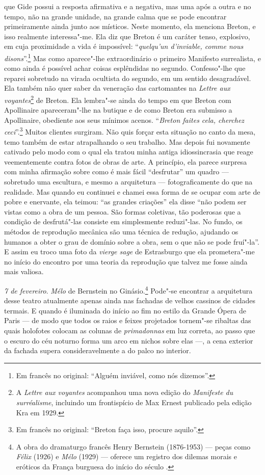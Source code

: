 que Gide possui a resposta afirmativa e a negativa, mas uma após a outra
e no tempo, não na grande unidade, na grande calma que se pode encontrar
primeiramente ainda junto aos místicos. Neste momento, ela menciona
Breton, e isso realmente interessa"-me. Ela diz que Breton é um caráter
tenso, explosivo, em cuja proximidade a vida é impossível:
``\emph{quelqu'un d'inviable, comme nous disons}''.\footnote{Em francês no original: ``Alguém inviável, como nós dizemos''. \versal{[N. T.]}} Mas como
aparece"-lhe extraordinário o primeiro Manifesto surrealista, e como
ainda é possível achar coisas esplêndidas no segundo. Confesso"-lhe que
reparei sobretudo na virada ocultista do segundo, em um sentido
desagradável. Ela também não quer saber da veneração das cartomantes na
\emph{Lettre aux voyantes}\footnote{A \emph{Lettre aux voyantes}
  acompanhou uma nova edição do \emph{Manifeste du surréalisme},
  incluindo um frontispício de Max Ernest publicado pela edição Kra em
  1929. \versal{[N. E.]}} de Breton. Ela lembra"-se ainda do tempo em que Breton com
Apollinaire apareceram"-lhe na butique e de como Breton era submisso a
Apollinaire, obediente aos seus mínimos acenos. ``\emph{Breton faites
cela, cherchez ceci}''.\footnote{Em francês no original: ``Breton faça isso, procure
  aquilo''. \versal{[N. T.]}} Muitos clientes surgiram. Não quis
forçar esta situação no canto da mesa, temo também de estar atrapalhando
o seu trabalho. Mas depois fui novamente cativado pelo modo com o qual
ela tratou minha antiga idiossincrasia que reage veementemente contra
fotos de obras de arte. A princípio, ela parece surpresa com minha
afirmação sobre como é mais fácil ``desfrutar'' um quadro --- sobretudo uma
escultura, e mesmo a arquitetura --- fotograficamente do que na
realidade. Mas quando eu continuei e chamei essa forma de se ocupar com
arte de pobre e enervante, ela teimou: ``as grandes criações'' ela disse
``não podem ser vistas como a obra de um pessoa. São formas coletivas,
tão poderosas que a condição de desfrutá"-las consiste em simplesmente
reduzi"-las. No fundo, os métodos de reprodução mecânica são uma técnica
de redução, ajudando os humanos a obter o grau de domínio sobre a obra,
sem o que não se pode fruí"-la''. E assim eu troco uma foto da
\emph{vierge sage} de Estrasburgo que ela prometera"-me no início do
encontro por uma teoria da reprodução que talvez me fosse ainda mais
valiosa.

\emph{7 de fevereiro}. \emph{Mélo} de Bernstein no Ginásio.\footnote{A obra do dramaturgo francês Henry Bernstein (1876-1953) --- peças como
  \emph{Félix} (1926) e \emph{Mélo} (1929) --- oferece um registro dos
  dilemas morais e eróticos da França burguesa do início do século . \versal{[N. E.]}}
Pode"-se encontrar a arquitetura desse teatro atualmente apenas ainda nas
fachadas de velhos cassinos de cidades termais. E quando é iluminada
do início ao fim no estilo da Grande Ópera de Paris --- de
modo que todos os raios e feixes projetados tornem"-se ribaltas das quais
holofotes colocam as colunas de \emph{primadonnas} em luz correta, ao
passo que o escuro do céu noturno forma um arco em nichos sobre elas ---,
a cena exterior da fachada supera consideravelmente a do palco no
interior.

